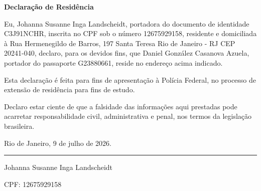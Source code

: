 \documentclass[11pt]{article}
\begin{document}
\begin{center}
{\Large\bfseries Declaração de Residência}
\end{center}

\bigskip

\noindent
Eu, Johanna Susanne Inga Landscheidt,
portadora do documento de identidade
C3J91NCHR,
inscrita no CPF sob o número
12675929158,
residente e domiciliada à
  Rua Hermenegildo de Barros, 197
  Santa Teresa
  Rio de Janeiro - RJ
  CEP 20241-040,
declaro, para os devidos fins,
que Daniel González Casanova Azuela,
portador do passaporte
G23880661,
reside no endereço acima indicado.

\medskip

\noindent
Esta declaração é feita para fins
de apresentação à Polícia Federal,
no processo de extensão de
residência para fins de estudo.

\medskip

\noindent
Declaro estar ciente de que a
falsidade das informações aqui
prestadas pode acarretar
responsabilidade civil,
administrativa e penal, nos termos
da legislação brasileira.

\vspace{2cm}

\noindent
Rio de Janeiro, 9 de
julho de 2026.

\vspace{2.5cm}

\begin{center}
\rule{8cm}{0.4pt}

Johanna Susanne Inga Landscheidt

CPF: 12675929158
\end{center}
\end{document}
